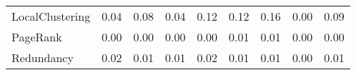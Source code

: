 \begin{table}
{{\begin{tabular}{|p{40mm}|ccc|ccccc|}
                  LocalClustering &                  {\small 0.04} &                   {\small 0.08} &                  {\small 0.04} &                     {\small 0.12} &                     {\small 0.12} &                   {\small 0.16} &                     {\small 0.00} &                     {\small 0.09} \\
                         PageRank &                  {\small 0.00} &                   {\small 0.00} &                  {\small 0.00} &                     {\small 0.00} &                     {\small 0.01} &                   {\small 0.01} &                     {\small 0.00} &                     {\small 0.00} \\
                       Redundancy &                  {\small 0.02} &                   {\small 0.01} &                  {\small 0.01} &                     {\small 0.02} &                     {\small 0.01} &                   {\small 0.01} &                     {\small 0.00} &                     {\small 0.01} \\
\bottomrule
\end{tabular}
}
}\end{table}
